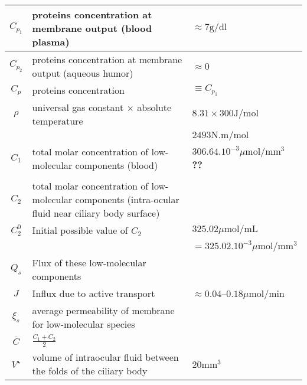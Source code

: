 \documentclass[11pt]{article}
\begin{document}
\begin{center}
\begin{tabular}{|c|p{}|l|}
 \hline
$ C_{p_1}$& proteins concentration at membrane output (blood plasma) & $\approx 7 \mathrm{g}/\mathrm{dl}$ \\
\hline
$C_{p_2}$ & proteins concentration at membrane output (aqueous humor) &$\approx 0$ \\
\hline
$C_p$ & proteins concentration & $\equiv C_{p_1}$ \\
\hline
$\rho$ & universal gas constant $\times$  absolute temperature &$8.31 \times 300 \mathrm{J}/\mathrm{mol} $\\
&& $2493 \mathrm{N}.\mathrm{m}/\mathrm{mol}$\\
\hline
$C_1$& total molar concentration of low-molecular components (blood) & $306.64.10^{-3} \mu \mathrm{mol}/\mathrm{mm}^3$ \textbf{??}\cite{to2002mechanism}\\\\
\hline
$C_2$& total molar concentration of low-molecular components (intra-ocular fluid near ciliary body surface) & \\
\hline
$C_2^0$&Initial possible value of $C_2$&$325.02 \mu \mathrm{mol}/\mathrm{mL}$ \\
& & $ = 325.02.10^{-3}	 \mu \mathrm{mol}/\mathrm{mm^3}$
\cite{to2002mechanism}\\
\hline
$Q_s$ & Flux of these low-molecular components & \\
\hline
$J$ & Influx due to active transport & $\approx 0.04$--$0.18 \mu \mathrm{mol} / \mathrm{min}$\\
\hline
$\xi_s$ & average permeability of membrane for low-molecular species& \\
\hline
$\overline{C}$& $\displaystyle{\frac{C_1+C_2}{2}}$& \\
\hline

$V^\star$ & volume of intraocular fluid between the folds of the ciliary body & $20 \mathrm{mm}^3 $\\
\hline 

\end{tabular}
\end{center}
\end{document}
